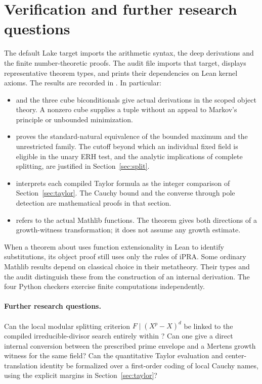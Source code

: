 \section{Verification and further research questions}\label{sec:buildnew}
The default Lake target imports the arithmetic syntax, the deep derivations and the finite number-theoretic proofs. The audit file  imports that target, displays representative theorem types, and prints their dependencies on Lean kernel axioms. The results are recorded in . In particular:
\begin{itemize}\setlength\itemsep{2pt}
\item {} and the three cube biconditionals give actual derivations in the scoped object theory. A nonzero cube supplies a tuple without an appeal to Markov's principle or unbounded minimization.
\item {} proves the standard-natural equivalence of the bounded maximum and the unrestricted family. The cutoff beyond which an individual fixed field is eligible in the unary ERH test, and the analytic implications of complete splitting, are justified in Section~\ref{sec:split}.
\item {} interprets each compiled Taylor formula as the integer comparison of Section~\ref{sec:taylor}. The Cauchy bound and the converse through pole detection are mathematical proofs in that section.
\item {} refers to the actual Mathlib functions. The theorem gives both directions of a growth-witness transformation; it does not assume any growth estimate.
\end{itemize}
When a theorem about  uses function extensionality in Lean to identify substitutions, its object proof still uses only the rules of iPRA. Some ordinary Mathlib results depend on classical choice in their metatheory. Their types and the audit distinguish these from the construction of an internal derivation. The four Python checkers exercise finite computations independently.
\paragraph{Further research questions.}
Can the local modular splitting criterion $F\mid(X^p-X)^d$ be linked to the compiled irreducible-divisor search entirely within ? Can one give a direct internal conversion between the prescribed prime envelope and a Mertens growth witness for the same field? Can the quantitative Taylor evaluation and center-translation identity be formalized over a first-order coding of local Cauchy names, using the explicit margins in Section~\ref{sec:taylor}?
